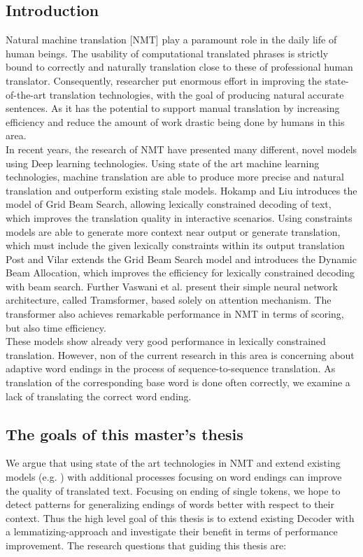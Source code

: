 \documentclass{task_description}
\begin{document}
\subsection*{Introduction}
%
Natural machine translation [NMT] play a paramount role in the daily life of human beings. The usability of computational translated phrases is strictly bound to correctly and naturally translation close to these of professional human translator. Consequently, researcher put enormous effort in improving the state-of-the-art translation technologies, with the goal of producing natural accurate sentences. As it has the potential to support manual translation by increasing efficiency and reduce the amount of work drastic being done by humans in this area. \\
In recent years, the research of NMT have presented many different, novel models using Deep learning technologies. Using state of the art machine learning technologies, machine translation are able to produce more precise and natural translation and outperform existing stale models. Hokamp and Liu\cite{Hokamp} introduces the model of Grid Beam Search, allowing lexically constrained decoding of text, which improves the translation quality in interactive scenarios. Using constraints models are able to generate more context near output or generate translation, which must include the given lexically constraints within its output translation\\
Post and Vilar\cite{post} extends the Grid Beam Search model and introduces the Dynamic Beam Allocation, which improves the efficiency for lexically constrained decoding with beam search. Further Vaswani et al. \cite{vaswani} present their simple neural network architecture, called Tramsformer, based solely on attention mechanism. The transformer also achieves remarkable performance in NMT in terms of scoring, but also time efficiency.\\
These models show already very good performance in lexically constrained translation. However, non of the current research in this area is concerning about adaptive word endings in the process of sequence-to-sequence translation. As translation of the corresponding base word is done often correctly, we examine a lack of translating the correct word ending.
\newpage

\subsection*{The goals of this master's thesis}
We argue that using state of the art technologies in NMT and extend existing models (e.g. \cite{libovick}) with additional processes focusing on word endings can improve the quality of translated text. Focusing on ending of single tokens, we hope to detect patterns for generalizing endings of words better with respect to their context. Thus the high level goal of this thesis is to extend existing Decoder with a lemmatizing-approach and investigate their benefit in terms of performance improvement. The research questions that guiding this thesis are:
\end{document}

